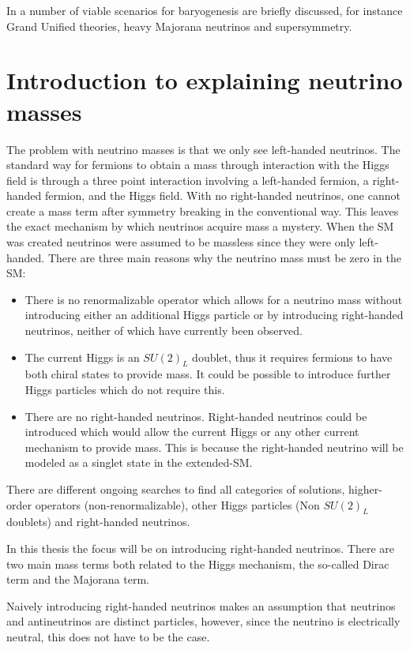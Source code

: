 In \cite{47Soler} a number of viable scenarios for baryogenesis are briefly discussed, for instance Grand Unified theories, heavy Majorana neutrinos and supersymmetry.

\section{Introduction to explaining neutrino masses}
The problem with neutrino masses is that we only see left-handed neutrinos. The standard way for fermions to obtain a mass through interaction with the Higgs field is through a three point interaction involving a left-handed fermion, a right-handed fermion, and the Higgs field. With no right-handed neutrinos, one cannot create a mass term after symmetry breaking in the conventional way. This leaves the exact mechanism by which neutrinos acquire mass a mystery. When the SM was created neutrinos were assumed to be massless since they were only left-handed. There are three main reasons why the neutrino mass must be zero in the SM:
\begin{itemize}
\item There is no renormalizable operator which allows for a neutrino mass without introducing either an additional Higgs particle or by introducing right-handed neutrinos, neither of which have currently been observed.

\item The current Higgs is an $SU(2)_L$ doublet, thus it requires fermions to have both chiral states to provide mass. It could be possible to introduce further Higgs particles which do not require this.

\item There are no right-handed neutrinos. Right-handed neutrinos could be introduced which would allow the current Higgs or any other current mechanism to provide mass. This is because the right-handed neutrino will be modeled as a singlet state in the extended-SM.
\end{itemize}

There are different ongoing searches to find all categories of solutions, higher-order operators (non-renormalizable), other Higgs particles (Non $SU(2)_L $ doublets) and right-handed neutrinos.

In this thesis the focus will be on introducing right-handed neutrinos. There are two main mass terms both related to the Higgs mechanism, the so-called Dirac term and the Majorana term.

Naively introducing right-handed neutrinos makes an assumption that neutrinos and antineutrinos are distinct particles, however, since the neutrino is electrically neutral, this does not have to be the case.
 
